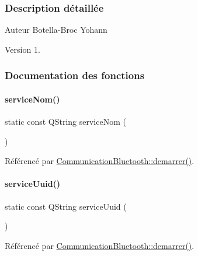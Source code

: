 \subsubsection{Description détaillée}
\begin{DoxyAuthor}{Auteur}
Botella-\/\+Broc Yohann
\end{DoxyAuthor}
\begin{DoxyVersion}{Version}
1. 
\end{DoxyVersion}


\subsubsection{Documentation des fonctions}
\mbox{\label{ecran-_t_t_p_a_2communicationbluetooth_8h_a0b0819170cad3a534c62951bcbe70436}} 
\paragraph{\texorpdfstring{service\+Nom()}{serviceNom()}}
{\footnotesize\ttfamily static const Q\+String service\+Nom (\begin{DoxyParamCaption}\item[{Q\+String\+Literal(\char`\"{}raspberry\char`\"{})}]{ }\end{DoxyParamCaption})\hspace{0.3cm}{\ttfamily [static]}}



Référencé par \hyperlink{class_communication_bluetooth_a056f2cb0ff59757e027a430e356e22bc}{Communication\+Bluetooth\+::demarrer()}.

\mbox{\label{ecran-_t_t_p_a_2communicationbluetooth_8h_a89b03bf9986896053fdab3d4f80d7c04}} 
\paragraph{\texorpdfstring{service\+Uuid()}{serviceUuid()}}
{\footnotesize\ttfamily static const Q\+String service\+Uuid (\begin{DoxyParamCaption}\item[{Q\+String\+Literal(\char`\"{}00001101-\/0000-\/1000-\/8000-\/00805\+F9\+B34\+F\+B\char`\"{})}]{ }\end{DoxyParamCaption})\hspace{0.3cm}{\ttfamily [static]}}



Référencé par \hyperlink{class_communication_bluetooth_a056f2cb0ff59757e027a430e356e22bc}{Communication\+Bluetooth\+::demarrer()}.

